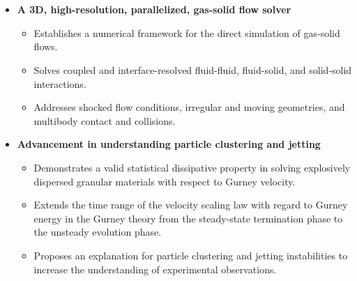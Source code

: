 \section{}
\begin{frame}[fragile]
    \frametitle{}

    \begin{itemize}
        \item \textbf{A 3D, high-resolution, parallelized, gas-solid flow solver}
            \begin{itemize}
                    \footnotesize
                \item Establishes a numerical framework for the direct simulation of gas-solid flows.
                \item Solves coupled and interface-resolved fluid-fluid, fluid-solid, and solid-solid interactions.
                \item Addresses shocked flow conditions, irregular and moving geometries, and multibody contact and collisions.
            \end{itemize}
        \item\textbf{Advancement in understanding particle clustering and jetting}
            \begin{itemize}
                    \footnotesize
                \item Demonstrates a valid statistical dissipative property in solving explosively dispersed granular materials with respect to Gurney velocity.
                \item Extends the time range of the velocity scaling law with regard to Gurney energy in the Gurney theory from the steady-state termination phase to the unsteady evolution phase.
                \item Proposes an explanation for particle clustering and jetting instabilities to increase the understanding of experimental observations.
            \end{itemize}
    \end{itemize}
\end{frame}
